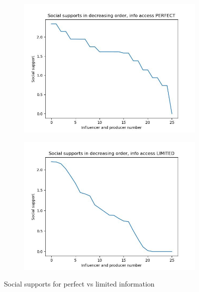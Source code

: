 \documentclass[11pt, letterpaper]{article}
\begin{document}
\begin{figure}[h]
    \centering
\begin{adjustbox}{max width=1.5\textwidth,center}
    \begin{subfigure}[b]{0.45\textwidth}
        \includegraphics[width=\linewidth]{"figures/lim/1_supps.jpg"}
    \end{subfigure}
    \begin{subfigure}[b]{0.45\textwidth}
        \includegraphics[width=\linewidth]{"figures/lim/2_supps.jpg"}
    \end{subfigure}
\end{adjustbox}
\caption{Social supports for perfect vs limited information}
\label{fig:lim_supps}
\end{figure}
\end{document}
